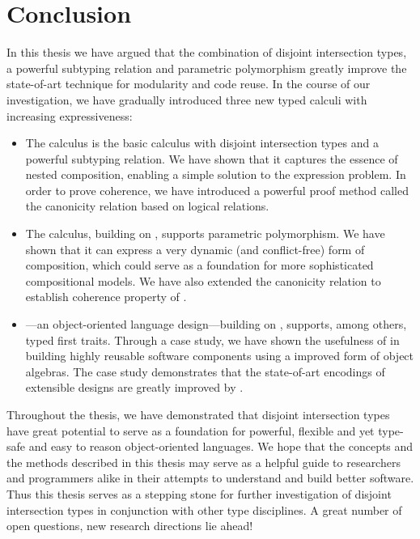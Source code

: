 \chapter{Conclusion}
\label{chap:conclusion}


In this thesis we have argued that the combination of disjoint intersection
types, a powerful subtyping relation and parametric polymorphism greatly improve
the state-of-art technique for modularity and code reuse. In the course of our
investigation, we have gradually introduced three new typed calculi with
increasing expressiveness:
\begin{itemize}
\item The \namee calculus is the basic calculus with disjoint intersection types
  and a powerful subtyping relation. We have shown that it captures the essence
  of nested composition, enabling a simple solution to the expression problem.
  In order to prove coherence, we have introduced a powerful proof method called
  the canonicity relation based on logical relations.
\item The \fnamee calculus, building on \namee, supports parametric
  polymorphism. We have shown that it can express a very dynamic (and
  conflict-free) form of composition, which could serve as a foundation for more
  sophisticated compositional models. We have also extended the canonicity
  relation to establish coherence property of \fnamee.
\item \sedel---an object-oriented language design---building on \fnamee,
  supports, among others, typed first traits. Through a case study, we have
  shown the usefulness of \fnamee in building highly reusable software
  components using a improved form of object algebras. The case study
  demonstrates that the state-of-art encodings of extensible designs are greatly
  improved by \fnamee.
\end{itemize}

Throughout the thesis, we have demonstrated that disjoint intersection types have great
potential to serve as a foundation for powerful, flexible and yet type-safe and
easy to reason object-oriented languages. We hope that the concepts and the
methods described in this thesis may serve as a helpful guide to researchers and
programmers alike in their attempts to understand and build better software.
Thus this thesis serves as a stepping stone for further investigation of
disjoint intersection types in conjunction with other type disciplines. A great
number of open questions, new research directions lie ahead!




